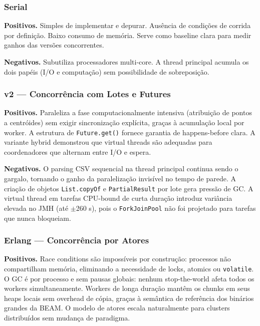 \subsubsection*{Serial}

\textbf{Positivos.}
Simples de implementar e depurar. Ausência de condições de corrida por definição.
Baixo consumo de memória. Serve como baseline clara para medir ganhos das versões
concorrentes.

\textbf{Negativos.}
Subutiliza processadores multi-core. A thread principal acumula os dois papéis
(I/O e computação) sem possibilidade de sobreposição.

\subsubsection*{v2 --- Concorrência com Lotes e Futures}

\textbf{Positivos.}
Paraleliza a fase computacionalmente intensiva (atribuição de pontos a centróides)
sem exigir sincronização explícita, graças à acumulação local por worker. A
estrutura de \texttt{Future.get()} fornece garantia de happens-before clara. A
variante hybrid demonstrou que virtual threads são adequadas para coordenadores
que alternam entre I/O e espera.

\textbf{Negativos.}
O parsing CSV sequencial na thread principal continua sendo o gargalo, tornando o
ganho da paralelização invisível no tempo de parede. A criação de objetos
\texttt{List.copyOf} e \texttt{PartialResult} por lote gera pressão de GC.
A virtual thread em tarefas CPU-bound de curta duração introduz variância elevada
no JMH (até $\pm$260 s), pois o \texttt{ForkJoinPool} não foi projetado para
tarefas que nunca bloqueiam.

\subsubsection*{Erlang --- Concorrência por Atores}

\textbf{Positivos.}
Race conditions são impossíveis por construção: processos não compartilham memória,
eliminando a necessidade de locks, atomics ou \texttt{volatile}. O GC é por
processo e sem pausas globais: nenhum stop-the-world afeta todos os workers
simultaneamente. Workers de longa duração mantêm os chunks em seus heaps locais
sem overhead de cópia, graças à semântica de referência dos binários grandes da
BEAM. O modelo de atores escala naturalmente para clusters distribuídos sem
mudança de paradigma.

